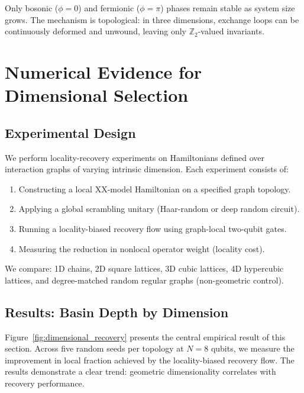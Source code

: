 \documentclass[11pt]{article}
\begin{document}
Only bosonic ($\phi = 0$) and fermionic ($\phi = \pi$) phases remain stable as system size grows. The mechanism is topological: in three dimensions, exchange loops can be continuously deformed and unwound, leaving only $\mathbb{Z}_2$-valued invariants.

\section{Numerical Evidence for Dimensional Selection}

\subsection{Experimental Design}

We perform locality-recovery experiments on Hamiltonians defined over interaction graphs of varying intrinsic dimension. Each experiment consists of:

\begin{enumerate}
\item Constructing a local XX-model Hamiltonian on a specified graph topology.
\item Applying a global scrambling unitary (Haar-random or deep random circuit).
\item Running a locality-biased recovery flow using graph-local two-qubit gates.
\item Measuring the reduction in nonlocal operator weight (locality cost).
\end{enumerate}

We compare: 1D chains, 2D square lattices, 3D cubic lattices, 4D hypercubic lattices, and degree-matched random regular graphs (non-geometric control).

\subsection{Results: Basin Depth by Dimension}

Figure~\ref{fig:dimensional_recovery} presents the central empirical result of this section. Across five random seeds per topology at $N=8$ qubits, we measure the improvement in local fraction achieved by the locality-biased recovery flow. The results demonstrate a clear trend: geometric dimensionality correlates with recovery performance.
\end{document}
